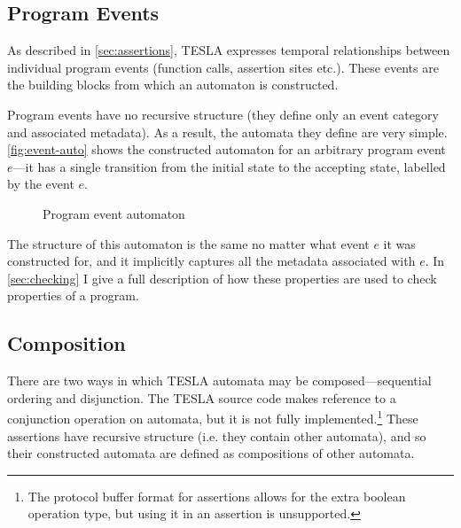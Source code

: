 \subsection{Program Events}

As described in \autoref{sec:assertions}, TESLA expresses temporal relationships
between individual program events (function calls, assertion sites
etc.). These events are the building blocks from which an automaton is
constructed.

Program events have no recursive structure (they define only an event
category and associated metadata). As a result, the automata they define
are very simple.  \autoref{fig:event-auto} shows the constructed
automaton for an arbitrary program event $e$---it has a single
transition from the initial state to the accepting state, labelled by
the event $e$.

\begin{figure}[ht]
  \centering
  \caption{Program event automaton}
  \label{fig:event-auto}
\end{figure}

The structure of this automaton is the same no matter what event $e$ it
was constructed for, and it implicitly captures all the metadata
associated with $e$. In \autoref{sec:checking} I give a full description
of how these properties are used to check properties of a program.

\subsection{Composition}

There are two ways in which TESLA automata may be composed---sequential
ordering and disjunction. The TESLA source code makes reference to a
conjunction operation on automata, but it is not fully
implemented.\footnote{The protocol buffer format for assertions allows
for the extra boolean operation type, but using it in an assertion is
unsupported.} These assertions have recursive structure (i.e.  they
contain other automata), and so their constructed automata are defined
as compositions of other automata.

